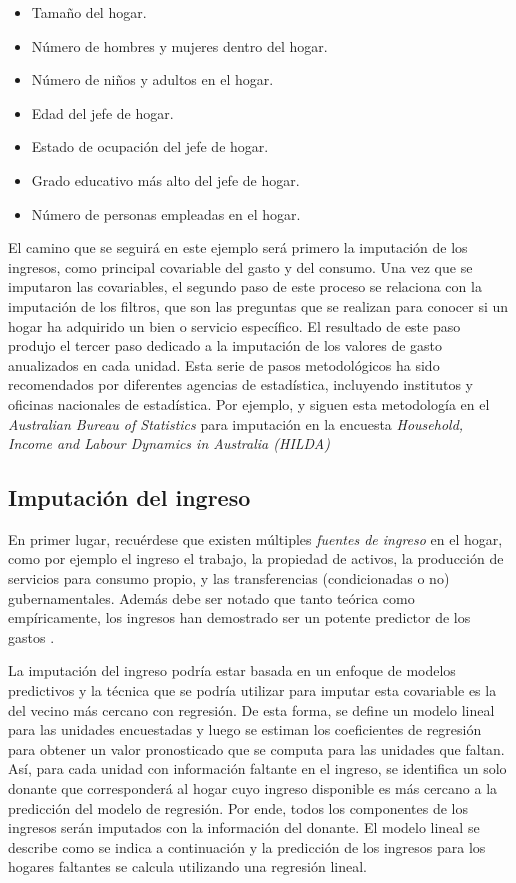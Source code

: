 \documentclass[
  12pt,
]{book}
\providecommand{\tightlist}{%
  \setlength{\itemsep}{0pt}\setlength{\parskip}{0pt}}
\begin{document}
\begin{itemize}
\tightlist
\item
  Tamaño del hogar.
\item
  Número de hombres y mujeres dentro del hogar.
\item
  Número de niños y adultos en el hogar.
\item
  Edad del jefe de hogar.
\item
  Estado de ocupación del jefe de hogar.
\item
  Grado educativo más alto del jefe de hogar.
\item
  Número de personas empleadas en el hogar.
\end{itemize}

El camino que se seguirá en este ejemplo será primero la imputación de los ingresos, como principal covariable del gasto y del consumo. Una vez que se imputaron las covariables, el segundo paso de este proceso se relaciona con la imputación de los filtros, que son las preguntas que se realizan para conocer si un hogar ha adquirido un bien o servicio específico. El resultado de este paso produjo el tercer paso dedicado a la imputación de los valores de gasto anualizados en cada unidad. Esta serie de pasos metodológicos ha sido recomendados por diferentes agencias de estadística, incluyendo institutos y oficinas nacionales de estadística. Por ejemplo, \citet{Hayes_Watson_2009} y \citet{Sun_2010} siguen esta metodología en el \emph{Australian Bureau of Statistics} para imputación en la encuesta \emph{Household, Income and Labour Dynamics in Australia (HILDA)}

\hypertarget{imputaciuxf3n-del-ingreso}{%
\subsection{Imputación del ingreso}\label{imputaciuxf3n-del-ingreso}}

En primer lugar, recuérdese que existen múltiples \emph{fuentes de ingreso} en el hogar, como por ejemplo el ingreso el trabajo, la propiedad de activos, la producción de servicios para consumo propio, y las transferencias (condicionadas o no) gubernamentales. Además debe ser notado que tanto teórica como empíricamente, los ingresos han demostrado ser un potente predictor de los gastos \citep{Starick_Watson_2011}.

La imputación del ingreso podría estar basada en un enfoque de modelos predictivos y la técnica que se podría utilizar para imputar esta covariable es la del vecino más cercano con regresión. De esta forma, se define un modelo lineal para las unidades encuestadas y luego se estiman los coeficientes de regresión para obtener un valor pronosticado que se computa para las unidades que faltan. Así, para cada unidad con información faltante en el ingreso, se identifica un solo donante que corresponderá al hogar cuyo ingreso disponible es más cercano a la predicción del modelo de regresión. Por ende, todos los componentes de los ingresos serán imputados con la información del donante. El modelo lineal se describe como se indica a continuación y la predicción de los ingresos para los hogares faltantes se calcula utilizando una regresión lineal.
\end{document}
